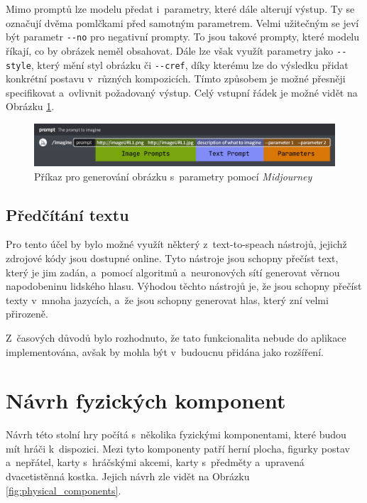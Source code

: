 Mimo promptů lze modelu předat i~parametry, které dále alterují výstup. Ty se označují dvěma pomlčkami před samotným parametrem. Velmi užitečným se jeví být parametr \texttt{{-}{-}no} pro negativní prompty. To jsou takové prompty, které modelu říkají, co by obrázek neměl obsahovat. Dále lze však využít parametry jako \texttt{{-}{-}style}, který mění styl obrázku či \texttt{{-}{-}cref}, díky kterému lze do výsledku přidat konkrétní postavu v~různých kompozicích. Tímto způsobem je možné přesněji specifikovat a~ovlivnit požadovaný výstup. Celý vstupní řádek je možné vidět na Obrázku \ref{fig:mj_prompts_params}.

\begin{figure}[H]
    \centering
    \includegraphics[width=1\textwidth]{resources/figures/midjourney_prompts_params.png}
    \caption{Příkaz pro generování obrázku s~parametry pomocí \textit{Midjourney} \cite{midjourney}}
    \label{fig:mj_prompts_params}
\end{figure}

\subsection{Předčítání textu}
Pro tento účel by bylo možné využít některý z~text-to-speach nástrojů, jejichž zdrojové kódy jsou dostupné online. Tyto nástroje jsou schopny přečíst text, který je jim zadán, a~pomocí algoritmů a~neuronových sítí generovat věrnou napodobeninu lidského hlasu. Výhodou těchto nástrojů je, že jsou schopny přečíst texty v~mnoha jazycích, a~že jsou schopny generovat hlas, který zní velmi přirozeně.

Z~časových důvodů bylo rozhodnuto, že tato funkcionalita nebude do aplikace implementována, avšak by mohla být v~budoucnu přidána jako rozšíření.

\section{Návrh fyzických komponent}
Návrh této stolní hry počítá s~několika fyzickými komponentami, které budou mít hráči k~dispozici. Mezi tyto komponenty patří herní plocha, figurky postav a~nepřátel, karty s~hráčskými akcemi, karty s~předměty a~upravená dvacetistěnná kostka. Jejich návrh zle vidět na Obrázku \ref{fig:physical_components}.

